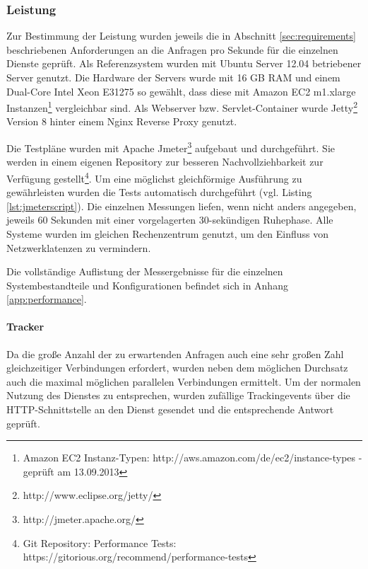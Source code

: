 \subsubsection{Leistung}\label{sec:performance}

Zur Bestimmung der Leistung wurden jeweils die in Abschnitt \ref{sec:requirements} beschriebenen Anforderungen an die Anfragen pro Sekunde für die einzelnen Dienste geprüft. Als Referenzsystem wurden mit Ubuntu Server 12.04 betriebener Server genutzt.  Die Hardware der Servers wurde mit 16 GB RAM und einem Dual-Core Intel Xeon E31275 so gewählt, dass diese mit Amazon EC2 m1.xlarge Instanzen\footnote{Amazon EC2 Instanz-Typen: http://aws.amazon.com/de/ec2/instance-types - geprüft am 13.09.2013} vergleichbar sind. Als Webserver bzw. Servlet-Container wurde Jetty\footnote{http://www.eclipse.org/jetty/} Version 8 hinter einem Nginx \gls{Reverse Proxy} genutzt.

Die Testpläne wurden mit Apache Jmeter\footnote{http://jmeter.apache.org/} aufgebaut und durchgeführt. Sie werden in einem eigenen Repository zur besseren Nachvollziehbarkeit zur Verfügung gestellt\footnote{Git Repository: Performance Tests: https://gitorious.org/recommend/performance-tests}. Um eine möglichst gleichförmige Ausführung zu gewährleisten wurden die Tests automatisch durchgeführt (vgl. Listing \ref{lst:jmeterscript}). Die einzelnen Messungen liefen, wenn nicht anders angegeben, jeweils 60 Sekunden mit einer vorgelagerten 30-sekündigen Ruhephase. Alle Systeme wurden im gleichen Rechenzentrum genutzt, um den Einfluss von Netzwerklatenzen zu vermindern.

Die vollständige Auflistung der Messergebnisse für die einzelnen Systembestandteile und Konfigurationen befindet sich in Anhang \ref{app:performance}.

 

\newpage

\paragraph{Tracker} Da die große Anzahl der zu erwartenden Anfragen auch eine sehr großen Zahl gleichzeitiger Verbindungen erfordert, wurden neben dem möglichen Durchsatz auch die maximal möglichen parallelen Verbindungen ermittelt. Um der normalen Nutzung des Dienstes zu entsprechen, wurden zufällige Trackingevents über die HTTP-Schnittstelle an den Dienst gesendet und die entsprechende Antwort geprüft.

